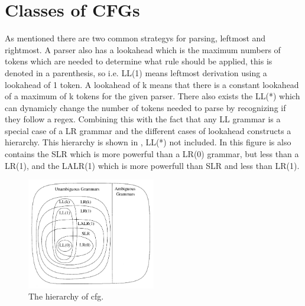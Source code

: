 \section{Classes of CFGs}
As mentioned there are two common strategys for parsing, leftmost and rightmost. 
A parser also has a lookahead which is the maximum numbers of tokens which are needed to determine what rule should be applied, this is denoted in a parenthesis, so i.e. LL(1) means leftmost derivation using a lookahead of 1 token. 
A lookahead of k means that there is a constant lookahead of a maximum of k tokens for the given parser. 
There also exists the LL(*) which can dynamicly change the number of tokens needed to parse by recognizing if they follow a \acrshort{regex}.
Combining this with the fact that any LL grammar is a special case of a LR grammar and the different cases of lookahead constructs a hierarchy. 
This hierarchy is shown in , LL(*) not included.
In this figure is also contains the SLR which is more powerful than a LR(0) grammar, but less than a LR(1), and the LALR(1) which is more powerfull than SLR and less than LR(1).
\begin{figure}[!ht]
\centering
 \includegraphics[width=0.5\textwidth]{figures/classesofgrammars.png} %
\caption{The hierarchy of \acrlong{cfg}. \citep{NvidiaCUDASeminar}}\label{image:hierarchyofgrammars}
\vspace{-15pt}
\end{figure}

